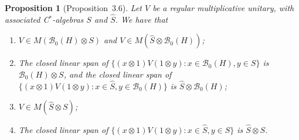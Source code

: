 \documentclass[a4paper,12pt]{article}
\theoremstyle{plain}
\newtheorem{proposition}{Proposition}[section]
\theoremstyle{definition}
\newcommand{\mc}{\mathcal}
\begin{document}
\begin{proposition}[Proposition~3.6]\label{prop:7}
Let $V$ be a regular multiplicative unitary, with associated C$^*$-algebras
$S$ and $\hat S$.  We have that
\begin{enumerate}
\item\label{prop:7.1} $V\in M(\mc B_0(H)\otimes S)$ and
  $V\in M(\hat S\otimes\mc B_0(H))$;
\item\label{prop:7.2} The closed linear span of $\{ (x\otimes 1)V(1\otimes y) :
x\in\mc B_0(H), y\in S \}$ is $\mc B_0(H)\otimes S$, and the closed linear
span of $\{ (x\otimes 1)V(1\otimes y) : x\in\hat S, y\in\mc B_0(H) \}$
is $\hat S\otimes\mc B_0(H)$;
\item\label{prop:7.3} $V\in M(\hat S\otimes S)$;
\item\label{prop:7.4} The closed linear span of
$\{ (x\otimes 1)V(1\otimes y) : x\in\hat S, y\in S\}$ is $\hat S\otimes S$.
\end{enumerate}
\end{proposition}
\end{document}
